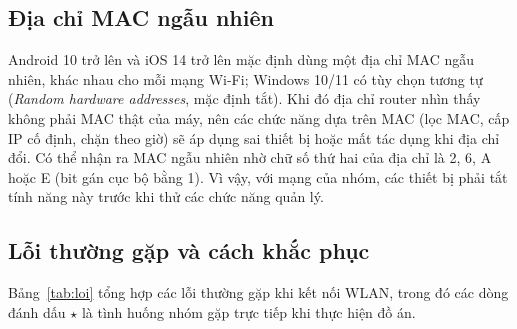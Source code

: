 \documentclass[12pt,a4paper]{article}
\numberwithin{figure}{section}
\numberwithin{table}{section}
\begin{document}
\subsection{Địa chỉ MAC ngẫu nhiên}
\label{subsec:macngaunhien}
Android 10 trở lên và iOS 14 trở lên mặc định dùng một địa chỉ
MAC ngẫu nhiên, khác nhau cho mỗi mạng Wi-Fi; Windows 10/11 có tùy chọn tương tự
(\emph{Random hardware addresses}, mặc định tắt). Khi đó địa chỉ router nhìn thấy
không phải MAC thật của máy, nên các chức năng dựa trên MAC (lọc MAC, cấp IP cố
định, chặn theo giờ) sẽ áp dụng sai thiết bị hoặc mất tác dụng khi địa chỉ đổi.
Có thể nhận ra MAC ngẫu nhiên nhờ chữ số thứ hai của địa chỉ là 2, 6, A hoặc E
(bit gán cục bộ bằng 1). Vì vậy, với mạng của nhóm, các thiết bị phải tắt tính
năng này trước khi thử các chức năng quản lý.

\subsection{Lỗi thường gặp và cách khắc phục}
\label{subsec:loi}
Bảng~\ref{tab:loi} tổng hợp các lỗi thường gặp khi kết nối WLAN, trong đó các
dòng đánh dấu $\star$ là tình huống nhóm gặp trực tiếp khi thực hiện đồ án.
\end{document}
